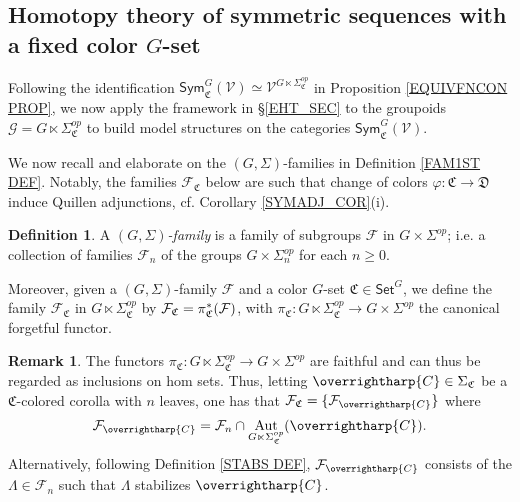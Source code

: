 \documentclass[a4paper,10pt
,draft
]{article}%
\numberwithin{equation}{section}
\numberwithin{figure}{section}
\theoremstyle{definition} %
\newtheorem{definition}[equation]{Definition}%
\newtheorem{remark}[equation]{Remark}%
\newcommand{\vect}[1]{\text{\overrightharp{\ensuremath{#1}}}}
\DeclareMathOperator{\Aut}{Aut}%
\newcommand{\F}{\ensuremath{\mathcal F}}
\newcommand{\V}{\ensuremath{\mathcal V}}
\newcommand{\G}{\ensuremath{\mathcal G}}
\newcommand{\1}{\ensuremath{\mathbbm 1}}%
\begin{document}
\subsection{Homotopy theory of symmetric sequences with a fixed color $G$-set}
\label{SYMC_MS_SEC}


Following the identification 
$\mathsf{Sym}^G_{\mathfrak{C}}(\V)
\simeq \V^{G \ltimes \Sigma^{op}_{\mathfrak{C}}}$
in Proposition \ref{EQUIVFNCON PROP},
we now apply the framework in \S \ref{EHT_SEC}  
to the groupoids
$\G = G \ltimes \Sigma_{\mathfrak C}^{op}$
to build model structures on the categories 
$\mathsf{Sym}^G_{\mathfrak{C}}(\V)$.
%

We now recall and elaborate on the $(G,\Sigma)$-families in Definition \ref{FAM1ST DEF}.
Notably, the families $\mathcal{F}_{\mathfrak{C}}$ below 
are such that 
change of colors $\varphi \colon \mathfrak{C} \to \mathfrak{D}$ 
induce Quillen adjunctions, cf. Corollary \ref{SYMADJ_COR}(i).




\begin{definition}\label{GSFAM_DEF}
A \emph{$(G,\Sigma)$-family} is a family of subgroups $\mathcal{F}$ in $G \times \Sigma^{op}$;
i.e.
a collection of families $\F_n$ of the groups $G\times \Sigma_n^{op}$ for each $n \geq 0$.
      
Moreover, given a $(G,\Sigma)$-family $\F$ and a color $G$-set $\mathfrak C \in \mathsf{Set}^G$,
we define the family
$\mathcal{F}_{\mathfrak{C}}$ in
$G \ltimes \Sigma^{op}_{\mathfrak{C}}$
by $\mathcal{F}_{\mathfrak{C}} = \pi^{\**}_{\mathfrak{C}}(\mathcal{F})$,
with $\pi_{\mathfrak{C}} \colon G \ltimes \Sigma_{\mathfrak{C}}^{op} \to G \times \Sigma^{op}$
the canonical forgetful functor.
\end{definition}






\begin{remark}\label{FAMC_DEF_REM}
The functors
$\pi_{\mathfrak{C}} \colon
G \ltimes \Sigma_{\mathfrak{C}}^{op} \to
G \times \Sigma^{op}$
are faithful and can thus be regarded as inclusions on hom sets.
Thus, letting $\vect{C} \in \Sigma_{\mathfrak{C}}$ be a
$\mathfrak{C}$-colored corolla with $n$ leaves,
one has that
$\F_{\mathfrak{C}} = \{\F_{\vect{C}}\}$ where
\begin{equation}\label{FAMC_DEF_EQ}
	\F_{\vect{C}} = \F_n \cap \Aut_{G \ltimes \Sigma_{\mathfrak C}^{op}}(\vect C).
\end{equation}
Alternatively, following
Definition \ref{STABS DEF},
$\F_{\vect{C}}$ consists of the $\Lambda \in \F_n$
such that $\Lambda$ stabilizes $\vect{C}$.
\end{remark}
\end{document}
